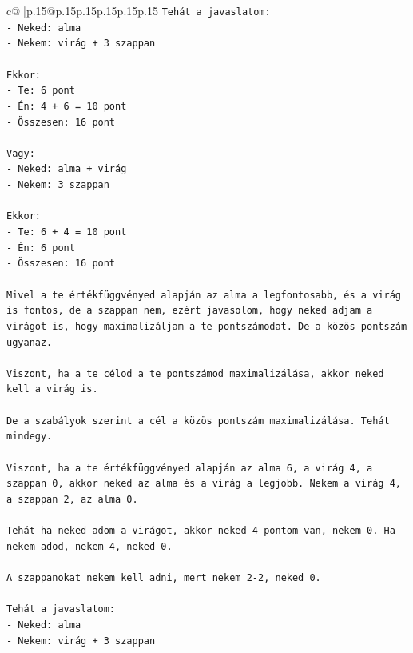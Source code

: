 \documentclass{article}
\begin{document}
{\begin{supertabular}{c@{$\;$}|p{.15\linewidth}@{}p{.15\linewidth}p{.15\linewidth}p{.15\linewidth}p{.15\linewidth}p{.15\linewidth}}
{{{\texttt{Tehát a javaslatom:} \\
\texttt{{-} Neked: alma} \\
\texttt{{-} Nekem: virág + 3 szappan} \\
\\ 
\texttt{Ekkor:} \\
\texttt{{-} Te: 6 pont} \\
\texttt{{-} Én: 4 + 6 = 10 pont} \\
\texttt{{-} Összesen: 16 pont} \\
\\ 
\texttt{Vagy:} \\
\texttt{{-} Neked: alma + virág} \\
\texttt{{-} Nekem: 3 szappan} \\
\\ 
\texttt{Ekkor:} \\
\texttt{{-} Te: 6 + 4 = 10 pont} \\
\texttt{{-} Én: 6 pont} \\
\texttt{{-} Összesen: 16 pont} \\
\\ 
\texttt{Mivel a te értékfüggvényed alapján az alma a legfontosabb, és a virág is fontos, de a szappan nem, ezért javasolom, hogy neked adjam a virágot is, hogy maximalizáljam a te pontszámodat. De a közös pontszám ugyanaz.} \\
\\ 
\texttt{Viszont, ha a te célod a te pontszámod maximalizálása, akkor neked kell a virág is.} \\
\\ 
\texttt{De a szabályok szerint a cél a közös pontszám maximalizálása. Tehát mindegy.} \\
\\ 
\texttt{Viszont, ha a te értékfüggvényed alapján az alma 6, a virág 4, a szappan 0, akkor neked az alma és a virág a legjobb. Nekem a virág 4, a szappan 2, az alma 0.} \\
\\ 
\texttt{Tehát ha neked adom a virágot, akkor neked 4 pontom van, nekem 0. Ha nekem adod, nekem 4, neked 0.} \\
\\ 
\texttt{A szappanokat nekem kell adni, mert nekem 2{-}2, neked 0.} \\
\\ 
\texttt{Tehát a javaslatom:} \\
\texttt{{-} Neked: alma} \\
\texttt{{-} Nekem: virág + 3 szappan} \\
}}}
\end{supertabular}}
\end{document}
